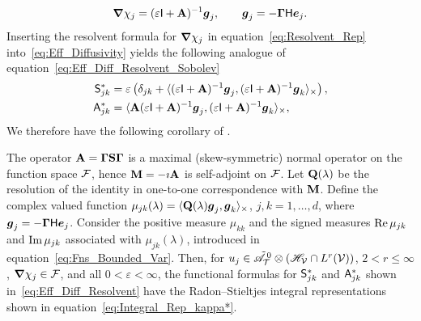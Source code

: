 \documentclass[amsa]{ipart}
\begin{document}
% 
\begin{align}\label{eq:Resolvent_Rep}
  \bnabla \chi_j=(\varepsilon\Ib+\Ab)^{-1}\vecg_j,
  \qquad
  \vecg_j=-\bGamma\Hm\vece_j.
\end{align}
%
Inserting the resolvent formula for
$\mbox{\boldmath${\nabla}$}\chi_j$ in equation~\eqref{eq:Resolvent_Rep}
into~\eqref{eq:Eff_Diffusivity} yields the following analogue 
of equation~\eqref{eq:Eff_Diff_Resolvent_Sobolev} 
%
\begin{align}\label{eq:Eff_Diff_Resolvent}
 \Sm^*_{jk}&=\varepsilon\left(\delta_{jk}+\langle(\varepsilon\Ib+\Ab)^{-1}\vecg_j,(\varepsilon\Ib+\Ab)^{-1}\vecg_k\rangle_\times\right),
 \\
 \Am^*_{jk}&=\langle\Ab(\varepsilon\Ib+\Ab)^{-1}\vecg_j,(\varepsilon\Ib+\Ab)^{-1}\vecg_k\rangle_\times,
 \notag
\end{align}
%
We therefore have the following corollary of .
%
\begin{corollary}\label{cor:Integral_Reps}
  The operator $\mathbf{A}=\mbox{\boldmath${\Gamma}$}\mathbf{S}\mbox{\boldmath${\Gamma}$}$ is a maximal (skew-symmetric)
  normal operator on the function space $\mathcal{F}$, hence $\mathbf{M}=-\imath\mathbf{A}$ is
  self-adjoint on $\mathcal{F}$. Let $\mathbf{Q}(\lambda)$ be the resolution of the
  identity in one-to-one correspondence with $\mathbf{M}$. Define the complex
  valued function $\mu_{jk}(\lambda)=\langle\mathbf{Q}(\lambda)\boldsymbol{g}_j,\boldsymbol{g}_k\rangle_\times$, $j,k=1,\ldots,d$,
  where $ \boldsymbol{g}_j=-\mbox{\boldmath${\Gamma}$}\mathsf{H}\boldsymbol{e}_j$. Consider the positive measure
  $\mu_{kk}$ and the 
  signed measures $\mbox{Re}\,\mu_{jk}$ and $\mbox{Im}\,\mu_{jk}$ associated with
  $\mu_{jk}(\lambda)$, introduced in
  equation~\eqref{eq:Fns_Bounded_Var}. Then, for
  $u_j\in\tilde{\mathscr{A}}^{\,0}_{\mathcal{T}}\otimes(\mathscr{H}_{\mathcal{V}}\cap L^r(\mathcal{V}))$, $2<r\leq\infty$,
  $\mbox{\boldmath${\nabla}$}\chi_j\in\mathcal{F}$, and all $0<\varepsilon<\infty$, the functional formulas for
  $\mathsf{S}^*_{jk}$ and $\mathsf{A}^*_{jk}$ shown in~\eqref{eq:Eff_Diff_Resolvent}
  have the Radon--Stieltjes integral representations shown in
  equation~\eqref{eq:Integral_Rep_kappa*}.     
% 
\end{corollary}
%
\end{document}
